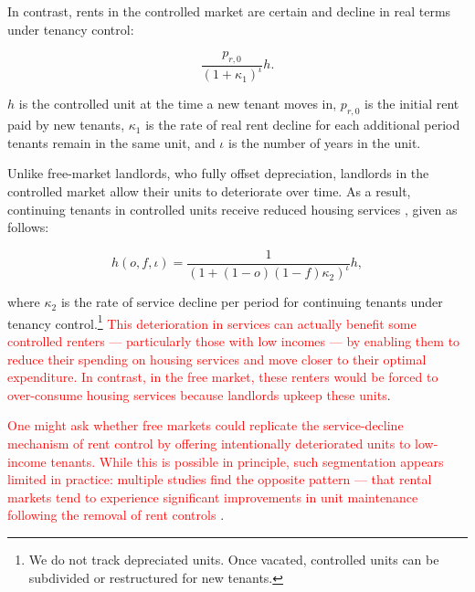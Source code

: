 \documentclass[parskip=full]{article}
\begin{document}
In contrast, rents in the controlled market are certain and decline in real terms under tenancy control:

\begin{equation}\label{eq:rent_in_controlled_market}
\frac{p_{r,0}}{(1+\kappa_{1})^{\iota}} h.
\end{equation} 

\noindent $h$ is the controlled unit at the time a new tenant moves in, $p_{r,0}$ is the initial rent paid by new tenants, $\kappa_{1}$ is the rate of real rent decline for each additional period tenants remain in the same unit, and $\iota$ is the number of years in the unit.

Unlike free-market landlords, who fully offset depreciation, landlords in the controlled market allow their units to deteriorate over time. As a result, continuing tenants in controlled units receive reduced housing services \citep{gl-1990,murray_et_al-1991}, given as follows:

\begin{equation}
h(o,f,\iota)=\frac{1}{(1+(1-o)(1-f)\kappa_{2})^{\iota}} h,
\end{equation}
 
\noindent where $\kappa_{2}$ is the rate of service decline per period for continuing tenants under tenancy control.\footnote{We do not track depreciated units. Once vacated, controlled units can be subdivided or restructured for new tenants.} \textcolor{red}{This deterioration in services can actually benefit some controlled renters — particularly those with low incomes — by enabling them to reduce their spending on housing services and move closer to their optimal expenditure. In contrast, in the free market, these renters would be forced to over-consume housing services because landlords upkeep these units}.

\textcolor{red}{One might ask whether free markets could replicate the service-decline mechanism of rent control by offering intentionally deteriorated units to low-income tenants. While this is possible in principle, such segmentation appears limited in practice: multiple studies find the opposite pattern — that rental markets tend to experience significant improvements in unit maintenance following the removal of rent controls} \citep[see][]{frankena-1975,gl-1990,sims-2007,app-2014}. %
\end{document}
